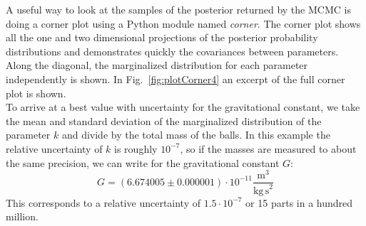 \documentclass[prb,preprint]{revtex4-1}
\begin{document}
A useful way to look at the samples of the posterior returned by the MCMC is doing a corner plot using a Python module named \textit{corner}\cite{corner}. The corner plot shows all the one and two dimensional projections of the posterior probability distributions and demonstrates quickly the covariances between parameters. Along the diagonal, the marginalized distribution for each parameter independently is shown.
In Fig.~\ref{fig:plotCorner4} an excerpt of the full corner plot is shown. \\
%
%


To arrive at a best value with uncertainty for the gravitational constant, we take the mean and standard deviation of the marginalized distribution of the parameter $k$ and divide by the total mass of the balls. In this example the relative uncertainty of $k$ is roughly $10^{-7}$, so if the masses are measured to about the same precision, we can write for the gravitational constant $G$:
\begin{equation}\label{Gfit}
G = \left(6.674005 \pm 0.000001 \right) \cdot 10^{-11}  \frac{\mathrm{m}^3}{\mathrm{kg \, s}^2}
\end{equation}
This corresponds to a relative uncertainty of $1.5 \cdot 10^{-7}$ or 15 parts in a hundred million.\\

%
%
\end{document}
